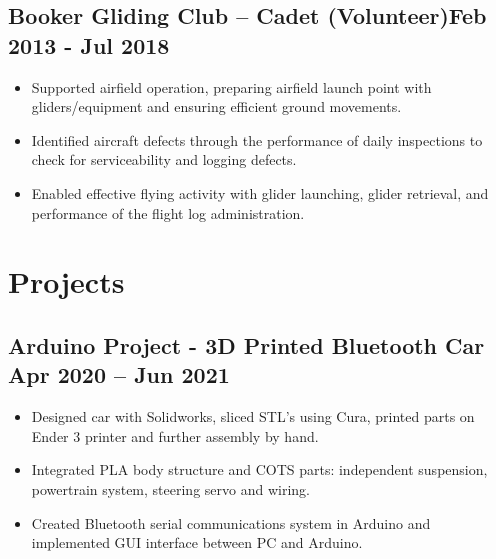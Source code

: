 \documentclass[a4paper,9pt]{article}
\begin{document}
\subsection*{\textbf{Booker Gliding Club – Cadet (Volunteer)}\hfill Feb 2013 - Jul 2018}
\begin{itemize}[noitemsep]

	\item Supported airfield operation, preparing airfield launch point with gliders/equipment and ensuring efficient ground movements.
	\item Identified aircraft defects through the performance of daily inspections to check for serviceability and logging defects.
	\item Enabled effective flying activity with glider launching, glider retrieval, and performance of the flight log administration.
\end{itemize}


\section*{Projects}

%
%
%
%

\subsection*{\textbf{Arduino Project - 3D Printed Bluetooth Car } \hfill  Apr 2020 – Jun 2021}
\begin{itemize}[noitemsep]
	\item  Designed car with Solidworks, sliced STL's using Cura, printed parts on Ender 3 printer and further assembly by hand.
	\item  Integrated PLA body structure and COTS parts: independent suspension, powertrain system, steering servo and wiring.
	\item  Created Bluetooth serial communications system in Arduino and implemented GUI interface between PC and Arduino.


\end{itemize}
\end{document}

